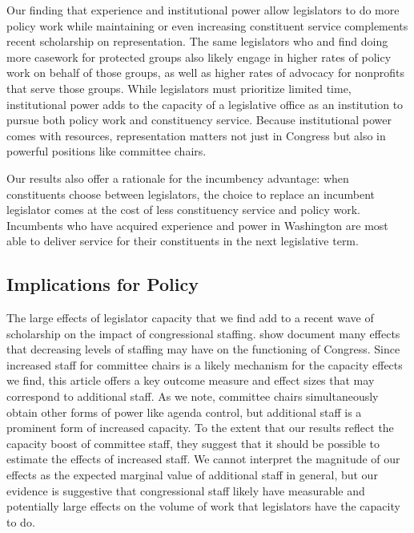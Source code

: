 \documentclass[12pt]{article}
\begin{document}
{%
Our finding that experience and institutional power allow legislators to do more policy work while maintaining or even increasing constituent service complements recent scholarship on representation.
The same legislators who \citet{Grose2011} and \citet{LowandeRitchieLauterbach2018} find doing more casework for protected groups also likely engage in higher rates of policy work on behalf of those groups, as well as higher rates of advocacy for nonprofits that serve those groups. 
While legislators must prioritize limited time, institutional power adds to the capacity of a legislative office as an institution to pursue both policy work and constituency service. Because institutional power comes with resources, representation matters not just in Congress but also in powerful positions like committee chairs. 

Our results also offer a rationale for the incumbency advantage: when constituents choose between legislators, the choice to replace an incumbent legislator comes at the cost of less constituency service and policy work. Incumbents who have acquired experience and power in Washington are most able to deliver service for their constituents in the next legislative term.    

\subsection{Implications for Policy}

The large effects of legislator capacity that we find add to a recent wave of scholarship on the impact of congressional staffing. \citet{LaPira2020} show document many effects that decreasing levels of staffing may have on the functioning of Congress. Since increased staff for committee chairs is a likely mechanism for the capacity effects we find, this article offers a key outcome measure and effect sizes that may correspond to additional staff. As we note, committee chairs simultaneously obtain other forms of power like agenda control, but additional staff is a prominent form of increased capacity. To the extent that our results reflect the capacity boost of committee staff, they suggest that it should be possible to estimate the effects of increased staff. We cannot interpret the magnitude of our effects as the expected marginal value of additional staff in general, but our evidence is suggestive that congressional staff likely have measurable and potentially large effects on the volume of work that legislators have the capacity to do. 

}
\end{document}
